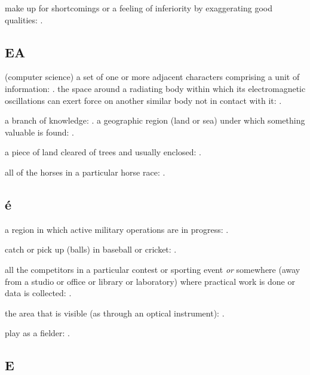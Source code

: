   make up for shortcomings or a feeling of inferiority by exaggerating good qualities:   .

\subsection*{EA}

  (computer science) a set of one or more adjacent characters comprising a unit of information: . the space around a radiating body within which its electromagnetic oscillations can exert force on another similar body not in contact with it:   .

  a branch of knowledge:   . a geographic region (land or sea) under which something valuable is found: .

  a piece of land cleared of trees and usually enclosed: .

  all of the horses in a particular horse race: .

\subsection*{é}

  a region in which active military operations are in progress:   .

  catch or pick up (balls) in baseball or cricket: .

  all the competitors in a particular contest or sporting event \textit{or} somewhere (away from a studio or office or library or laboratory) where practical work is done or data is collected: .

  the area that is visible (as through an optical instrument):   .

  play as a fielder: .

\subsection*{E}

